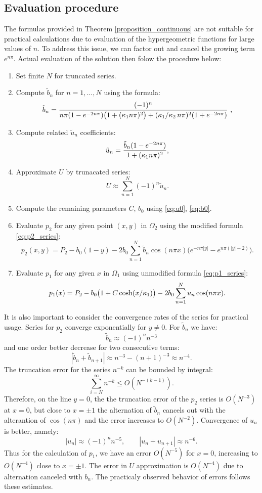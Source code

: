 \documentclass[sn-mathphys,Numbered]{sn-jnl}
\def\abs#1{{|#1|}}
\begin{document}
\subsection{Evaluation procedure}
\label{sec:eval}
The formulas provided in Theorem \ref{proposition_continuous} are not suitable for practical calculations due to evaluation of the hypergeometric functions for large values of $n$. To address this issue, we can factor out and cancel the growing term $e^{n \pi}$. Actual evaluation of the solution then folow the procedure below:

\begin{enumerate}
    \item Set finite $N$ for truncated series. 
    \item Compute $\tilde b_n$ for $n = 1, \dots, N$ using the formula:
    \[
        \tilde b_n = \frac{(-1)^n}{n \pi (1 - e^{-2n \pi}) \big(1 + (\kfrel n \pi)^2\big) 
            + (\kfrel / \kmrel\, n \pi)^2 (1 + e^{-2n \pi})} \ , 
    \]
    \item Compute related $\tilde u_n$ coefficients:
    \[
        \tilde u_n = \frac{\tilde b_n (1 - e^{-2n \pi})}{1 + (\kappa_1 n \pi)^2}, 
    \]
    \item Approximate $U$ by trunacated series:
    \[
        U \approx  \sum_{n=1}^{N} (-1)^n \tilde u_n.
    \]
    \item Compute the remaining parameters $C$, $b_0$ using \eqref{eq:u0}, \eqref{eq:b0}.
    \item Evaluate $p_2$ for any given point $(x,y)$ in $\Omega_2$ using the modified formula \eqref{eq:p2_series}:
    \[
        p_2(x,y) = P_2 - b_0(1-y) -2b_0 \sum_{n=1}^N \tilde b_n \cos(n \pi x) 
        \Big( e^{-n \pi |y|} - e^{n \pi (|y|-2)}\Big).
    \]
    \item Evaluate $p_1$ for any given $x$ in $\Omega_1$ using unmodified formula \eqref{eq:p1_series}:
    \[
        p_1(x) = P_2 - b_0\big(1 + C\cosh(x/\kappa_1)\big) - 2 b_0 \sum_{n=1}^N  u_n \cos(n \pi x). 
    \]    
\end{enumerate}

It is also important to consider the convergence rates of the series for practical usage.   
Series for $p_2$ converge exponentially for $y\ne 0$. 
For $\tilde b_n$ we have:
\[
    \tilde b_n \approx (-1)^n n^{-3} 
\]
and one order better decrease for two consecutive terms:
\[
    \abs{\tilde b_n + \tilde b_{n+1}} \approx n^{-3} - (n+1)^{-3} \approx  n^{-4}. 
\]
The truncation error for the series $n^{-k}$ can be bounded by integral: 
\[
    \sum_{i=N}^\infty n^{-k} \le O(N^{-(k-1)}).
\]
Therefore, on the line $y=0$, the the truncation error of the $p_2$ series is $O(N^{-3})$ at $x=0$, but close to $x=\pm 1$ the alternation of $\tilde b_n$ cancels out with the alterantion of $\cos(n \pi)$ and the error increases to $O(N^{-2})$.
Convergence of $u_n$ is better, namely:
\[
    \abs{u_n} \approx (-1)^n n^{-5},\qquad \abs{u_n+u_{n+1}} \approx  n^{-6}.
\]
Thus for the calculation of $p_1$, we have an error $O(N^{-5})$
for $x=0$, increasing to  $O(N^{-4})$ close to $x=\pm 1$. The error in $U$ approximation is $O(N^{-4})$ due to alternation canceled with $b_n$.
The practicaly observed behavior of errors follows these estimates. 
\end{document}
